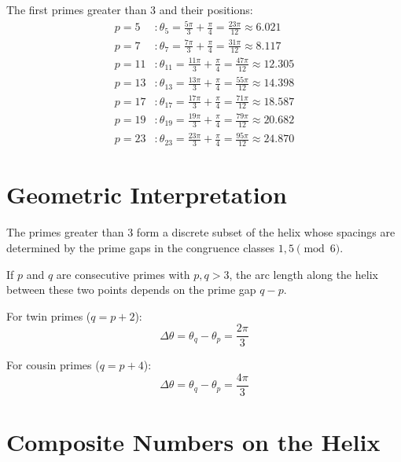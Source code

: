 \begin{example}\label{ex:first-primes}
The first primes greater than 3 and their positions:
\begin{align*}
p = 5 &: \theta_5 = \frac{5\pi}{3} + \frac{\pi}{4} = \frac{23\pi}{12} \approx 6.021\\
p = 7 &: \theta_7 = \frac{7\pi}{3} + \frac{\pi}{4} = \frac{31\pi}{12} \approx 8.117\\
p = 11 &: \theta_{11} = \frac{11\pi}{3} + \frac{\pi}{4} = \frac{47\pi}{12} \approx 12.305\\
p = 13 &: \theta_{13} = \frac{13\pi}{3} + \frac{\pi}{4} = \frac{55\pi}{12} \approx 14.398\\
p = 17 &: \theta_{17} = \frac{17\pi}{3} + \frac{\pi}{4} = \frac{71\pi}{12} \approx 18.587\\
p = 19 &: \theta_{19} = \frac{19\pi}{3} + \frac{\pi}{4} = \frac{79\pi}{12} \approx 20.682\\
p = 23 &: \theta_{23} = \frac{23\pi}{3} + \frac{\pi}{4} = \frac{95\pi}{12} \approx 24.870
\end{align*}
\end{example}

\section{Geometric Interpretation}

\begin{corollary}\label{cor:prime-distribution}
The primes greater than 3 form a discrete subset of the helix whose
spacings are determined by the prime gaps in the congruence classes
$1, 5 \pmod{6}$.
\end{corollary}

\begin{remark}\label{rem:prime-gaps}
If $p$ and $q$ are consecutive primes with $p, q > 3$, the arc length
along the helix between these two points depends on the prime gap $q - p$.

For twin primes ($q = p + 2$):
\[
\Delta\theta = \theta_q - \theta_p = \frac{2\pi}{3}
\]

For cousin primes ($q = p + 4$):
\[
\Delta\theta = \theta_q - \theta_p = \frac{4\pi}{3}
\]
\end{remark}

\section{Composite Numbers on the Helix}\label{sec:composites}


